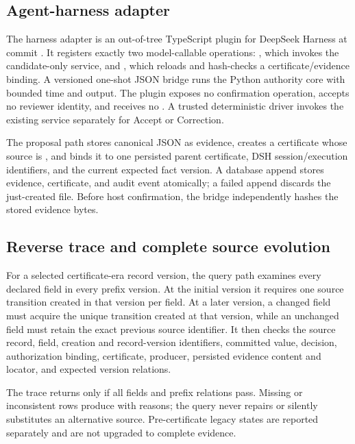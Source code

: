 \subsection{Agent-harness adapter}

The harness adapter is an out-of-tree TypeScript plugin for DeepSeek Harness  at commit . It registers exactly two model-callable operations: , which invokes the candidate-only service, and , which reloads and hash-checks a certificate/evidence binding. A versioned one-shot JSON bridge runs the Python authority core with bounded time and output. The plugin exposes no confirmation operation, accepts no reviewer identity, and receives no . A trusted deterministic driver invokes the existing  service separately for Accept or Correction.

The proposal path stores canonical JSON as  evidence, creates a certificate whose source is , and binds it to one persisted parent certificate, DSH session/execution identifiers, and the current expected fact version. A database append stores evidence, certificate, and audit event atomically; a failed append discards the just-created file. Before host confirmation, the bridge independently hashes the stored evidence bytes.

\subsection{Reverse trace and complete source evolution}

For a selected certificate-era record version, the query path examines every declared field in every prefix version. At the initial version it requires one source transition created in that version per field. At a later version, a changed field must acquire the unique transition created at that version, while an unchanged field must retain the exact previous source identifier. It then checks the source record, field, creation and record-version identifiers, committed value, decision, authorization binding, certificate, producer, persisted evidence content and locator, and expected version relations.

The trace returns  only if all fields and prefix relations pass. Missing or inconsistent rows produce  with reasons; the query never repairs or silently substitutes an alternative source. Pre-certificate legacy states are reported separately and are not upgraded to complete evidence.
